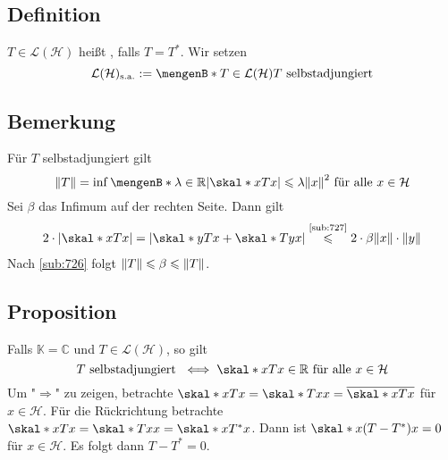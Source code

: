 \subsection[Definition: Selbstadjungierter Operator]{Definition} %
\label{sub:728}
$T \in \mathcal{L}(\mathcal{H})$ heißt , falls $T=T^*$. Wir setzen
\[
	\mathcal{L}(\mathcal{H})_\sa := \set[T \in \mathcal{L}(\mathcal{H})]{T \text{ selbstadjungiert}} 
\]

\subsection{Bemerkung} %
\label{sub:729}
Für $T$ selbstadjungiert gilt 
\[
	\norm{T}= \inf \set[\lambda \in \mathds{R}]{\abs*{\skal*{x}{T x}} \le \lambda \norm{x}^2 \text{ für alle } x \in \mathcal{H}}  
\]
Sei $\beta$ das Infimum auf der rechten Seite. Dann gilt
\begin{align*}
	2 \cdot \abs*{\skal*{x}{T x}} = \abs*{\skal*{y}{T x} + \skal*{T y}{x}} \stackrel{\mbox{\scriptsize \ref{sub:727}}}{\le} 2 \cdot \beta \norm{x} \cdot \norm{y} 
\end{align*}
Nach \ref{sub:726} folgt $\norm{T} \le \beta \le \norm{T}$. \bewende

\subsection{Proposition} %
\label{sub:730}
Falls $\mathds{K}=\mathds{C}$ und $T \in \mathcal{L}(\mathcal{H})$, so gilt
\[
	T \text{ selbstadjungiert } \iff \skal*{x}{T x} \in \mathds{R} \text{ für alle } x \in \mathcal{H}
\]
Um "$\Rightarrow$" zu zeigen, betrachte $\skal*{x}{T x} = \skal*{T x}{x} = \overline{\skal*{x}{T x}}$ für $x \in \mathcal{H}$. Für die Rückrichtung betrachte
$\skal*{x}{T x} = \skal*{T x}{x} = \skal*{x}{T^* x}$. Dann ist $\skal*{x}{(T-T^*)x}=0$ für $x \in \mathcal{H}$. Es folgt dann $T- T^*=0$. \bewende 

